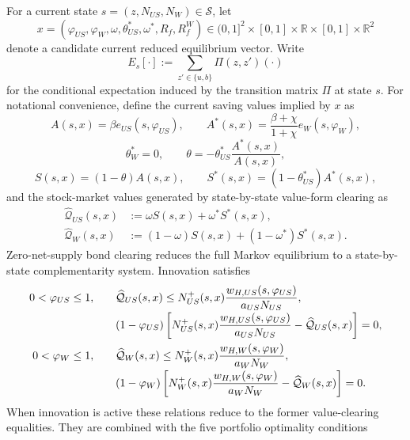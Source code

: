 \documentclass{article}
\def\green#1{#1}%
\begin{document}
For a current state $s=(z,N_{US},N_W)\in\mathcal S$, let
\[
x=(\varphi_{US},\varphi_W,\omega,\theta_{US}^*,\omega^*,R_f,R_f^W)
\in(\green{0},\green{1}]^\green{2\times}[\green{0},\green{1}]\green{\times}\green{\mathbb R\times}[\green{0},\green{1}]\green{\times}\mathbb R^\green{2}
\]
denote a candidate current reduced equilibrium vector. Write
\[
E_s[\cdot]:=\sum_{z'\in\{u,b\}}\Pi(z,z')(\cdot)
\]
for the conditional expectation induced by the transition matrix $\Pi$ at state $s$. For notational convenience, define the current saving values implied by $x$ as
\[
A(s,x)=\beta e_{US}(s,\varphi_{US}),
\qquad
A^*(s,x)=\frac{\beta+\chi}{1+\chi}e_W(s,\varphi_W),
\]
\[
\theta_W^*=0,
\qquad
\theta=-\theta_{US}^*\frac{A^*(s,x)}{A(s,x)},
\]
\[
S(s,x)=(1-\theta)A(s,x),
\qquad
S^*(s,x)=(1-\theta_{US}^*)A^*(s,x),
\]
and the stock-market values generated by state-by-state value-form clearing as
\begin{align}
\widehat{\mathcal Q}_{US}(s,x)
&:=\omega S(s,x)+\omega^*S^*(s,x),
\label{intratemporal_QUS}\\
\widehat{\mathcal Q}_{W}(s,x)
&:=(1-\omega)S(s,x)+(1-\omega^*)S^*(s,x).
\label{intratemporal_QW}
\end{align}
\green{Zero-net-supply} bond clearing reduces the full Markov equilibrium to \green{a state-by-state complementarity} system.  \green{Innovation satisfies}
\begin{align}
\green{0<\varphi}_{\green{US}}\green{\le1},\qquad
&\widehat{\mathcal Q}_{US}(s,x)
\green{\le}
\green{N}_{\green{US}}^\green{+}(\green{s},\green{x})\frac{\green{w}_{\green{H},\green{US}}(\green{s},\green{\varphi}_{\green{US}})}{\green{a}_{\green{US}}\green{N}_{\green{US}}},\notag\\[-0.2em]
&(\green{1-\varphi}_{\green{US}})
\left[
N_{US}^+(s,x)\frac{w_{H,US}(s,\varphi_{US})}{a_{US}N_{US}}
\green{-\widehat{\mathcal Q}}_{\green{US}}(\green{s},\green{x})
\right]=0,
\label{intratemporal_phi_US}\\
\green{0<\varphi}_\green{W\le1},\qquad
&\widehat{\mathcal Q}_{W}(s,x)
\green{\le}
\green{N}_\green{W}^\green{+}(\green{s},\green{x})\frac{\green{w}_{\green{H},\green{W}}(\green{s},\green{\varphi}_\green{W})}{\green{a}_\green{WN}_\green{W}},\notag\\[-0.2em]
&(\green{1-\varphi}_\green{W})
\left[
N_W^+(s,x)\frac{w_{H,W}(s,\varphi_W)}{a_WN_W}
\green{-\widehat{\mathcal Q}}_{\green{W}}(\green{s},\green{x})
\right]=0.
\label{intratemporal_phi_W}
\end{align}
\green{When innovation is active these relations reduce to the former value-clearing equalities}.  \green{They are combined} with the five portfolio optimality conditions
\end{document}
